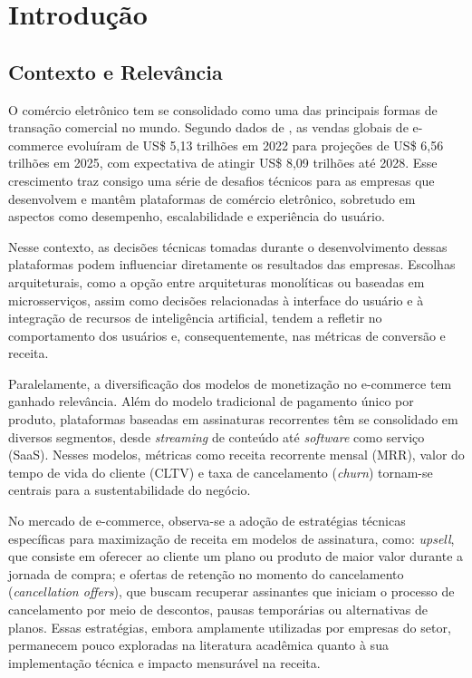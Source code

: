 \chapter{Introdução}
\label{ch:introducao}

\section{Contexto e Relevância}

O comércio eletrônico tem se consolidado como uma das principais formas de transação comercial no mundo. Segundo dados de \cite{shopify_relatorio_2025}, as vendas globais de e-commerce evoluíram de US\$ 5,13 trilhões em 2022 para projeções de US\$ 6,56 trilhões em 2025, com expectativa de atingir US\$ 8,09 trilhões até 2028. Esse crescimento traz consigo uma série de desafios técnicos para as empresas que desenvolvem e mantêm plataformas de comércio eletrônico, sobretudo em aspectos como desempenho, escalabilidade e experiência do usuário.

Nesse contexto, as decisões técnicas tomadas durante o desenvolvimento dessas plataformas podem influenciar diretamente os resultados das empresas. Escolhas arquiteturais, como a opção entre arquiteturas monolíticas ou baseadas em microsserviços, assim como decisões relacionadas à interface do usuário e à integração de recursos de inteligência artificial, tendem a refletir no comportamento dos usuários e, consequentemente, nas métricas de conversão e receita.

Paralelamente, a diversificação dos modelos de monetização no e-commerce tem ganhado relevância. Além do modelo tradicional de pagamento único por produto, plataformas baseadas em assinaturas recorrentes têm se consolidado em diversos segmentos, desde \textit{streaming} de conteúdo até \textit{software} como serviço (SaaS). Nesses modelos, métricas como receita recorrente mensal (MRR), valor do tempo de vida do cliente (CLTV) e taxa de cancelamento (\textit{churn}) tornam-se centrais para a sustentabilidade do negócio.

No mercado de e-commerce, observa-se a adoção de estratégias técnicas específicas para maximização de receita em modelos de assinatura, como: \textit{upsell}, que consiste em oferecer ao cliente um plano ou produto de maior valor durante a jornada de compra; e ofertas de retenção no momento do cancelamento (\textit{cancellation offers}), que buscam recuperar assinantes que iniciam o processo de cancelamento por meio de descontos, pausas temporárias ou alternativas de planos. Essas estratégias, embora amplamente utilizadas por empresas do setor, permanecem pouco exploradas na literatura acadêmica quanto à sua implementação técnica e impacto mensurável na receita.

